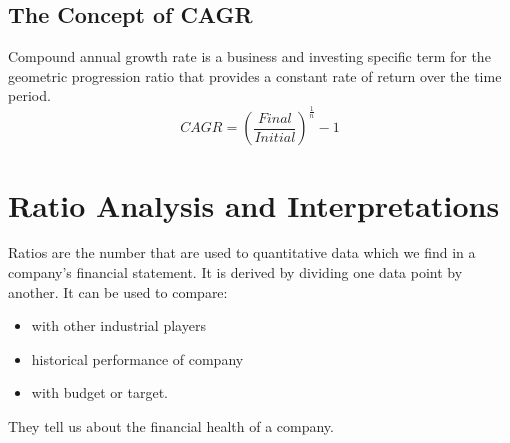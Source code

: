 \documentclass{article}
\begin{document}
\subsection{The Concept of CAGR}
Compound annual growth rate is a business and investing specific term for the geometric progression ratio that provides a constant rate of return over the time period.
$$CAGR = (\frac{Final}{Initial })^{\frac{1}{n}}-1$$

\section{Ratio Analysis and Interpretations}
Ratios are the number that are used to quantitative data which we find in a company's financial statement. It is derived by dividing one data point by another. It can be used to compare:
\begin{itemize}
    \item with other industrial players
    \item historical performance of company
    \item with budget or target.
\end{itemize}
They tell us about the financial health of a company. 
\end{document}
